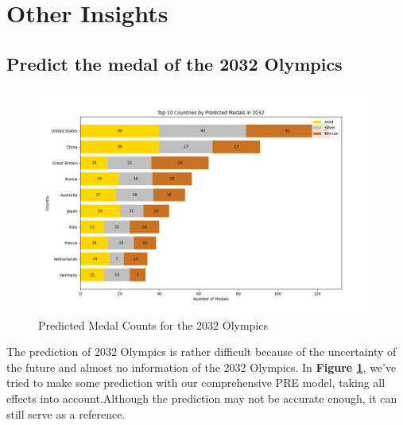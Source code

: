 \section{Other Insights}

\subsection{Predict the medal of the 2032 Olympics}

\begin{figure}[h]
\centering
\includegraphics[width=1\textwidth]{../figures/2032.png}
\caption{Predicted Medal Counts for the 2032 Olympics}
\label{fig:medal_prediction}
\end{figure}

The prediction of 2032 Olympics is rather difficult because of the uncertainty of the future and almost no information of the 2032 Olympics. In \textbf{Figure \ref{fig:medal_prediction}}, we've tried to make some prediction with our comprehensive PRE model, taking all effects into account.Although the prediction may not be accurate enough, it can still serve as a reference.

